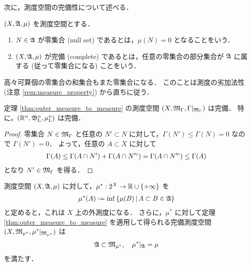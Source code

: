 次に，測度空間の完備性について述べる．

\begin{definition}
    $(X,\mathfrak{A},\mu)$ を測度空間とする．
    \begin{enumerate}
        \item $N\in\mathfrak{A}$ が零集合 (null set) であるとは，$\mu(N)=0$ となることをいう．
        \item $(X,\mathfrak{A},\mu)$ が完備 (complete) であるとは，任意の零集合の部分集合が $\mathfrak{A}$ に属する (従って零集合になる) ことをいう．
    \end{enumerate}
\end{definition}

\begin{remark}\label{rem:null_set_countable}
    高々可算個の零集合の和集合もまた零集合になる．
    このことは測度の劣加法性 (注意 \ref{rem:measure_property}) から直ちに従う．
\end{remark}

\begin{proposition}
    定理 \ref{thm:outer_measure_to_measure} の測度空間 $(X,\mathfrak{M}_\Gamma,\Gamma\vert_{\mathfrak{M}_\Gamma})$ は完備．
    特に，$(\mathbb{R}^n,\mathfrak{B}_{\mathrm{L}}^n,\mu_{\mathrm{L}}^n)$ は完備．
\end{proposition}

\begin{proof}
    零集合 $N\in\mathfrak{M}_\Gamma$ と任意の $N'\subset N$ に対して，$\Gamma(N')\le\Gamma(N)=0$ なので $\Gamma(N')=0$．
    よって，任意の $A\subset X$ に対して
    \begin{align*}
        \Gamma(A)
        \le\Gamma(A\cap N')+\Gamma(A\cap N'^{\mathrm{c}})
        =\Gamma(A\cap N'^{\mathrm{c}})
        \le\Gamma(A)
    \end{align*}
    となり $N'\in\mathfrak{M}_\Gamma$ を得る．
\end{proof}

\begin{theorem}\label{thm:measure_completion}
    測度空間 $(X,\mathfrak{A},\mu)$ に対して，$\mu^\ast:2^X\to\mathbb{R}\cup\{+\infty\}$ を
    \begin{align*}
        \mu^\ast(A)\defeq\inf\left\{
            \mu(B)\,\middle\vert\,A\subset B\in\Afrak
        \right\}
    \end{align*}
    と定めると，これは $X$ 上の外測度になる．
    さらに，$\mu^\ast$ に対して定理 \ref{thm:outer_measure_to_measure} を適用して得られる完備測度空間
    $(X,\mathfrak{M}_{\mu^*},\mu^\ast\vert_{\mathfrak{M}_{\mu^\ast}})$ は
    \begin{align*}
        \mathfrak{A}\subset\mathfrak{M}_{\mu^*},\quad
        \mu^\ast\vert_{\mathfrak{A}}=\mu
    \end{align*}
    を満たす．
\end{theorem}

